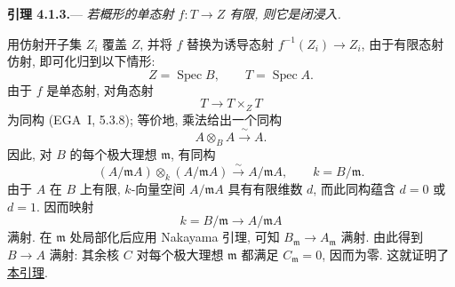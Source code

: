\medskip
{}\label{lem:sga3-V-4.1.3}%
\noindent\textbf{引理 4.1.3.}---
\textit{若概形的单态射 \(f:T\to Z\) 有限, 则它是闭浸入.}

用仿射开子集 \(Z_i\) 覆盖 \(Z\), 并将 \(f\) 替换为诱导态射
\(f^{-1}(Z_i)\to Z_i\), 由于有限态射仿射,
即可化归到以下情形:
\[
  Z=\operatorname{Spec}B,\qquad T=\operatorname{Spec}A.
\]
由于 \(f\) 是单态射, 对角态射
\[
  T\longrightarrow T\times_ZT
\]
为同构 (EGA~I, 5.3.8); 等价地, 乘法给出一个同构
\[
  A\otimes_BA\xrightarrow{\ \sim\ }A.
\]
因此, 对 \(B\) 的每个极大理想 \(\mathfrak m\), 有同构
\[
  (A/\mathfrak mA)\otimes_k(A/\mathfrak mA)
  \xrightarrow{\ \sim\ }A/\mathfrak mA,
  \qquad k=B/\mathfrak m.
\]
由于 \(A\) 在 \(B\) 上有限, \(k\)-向量空间 \(A/\mathfrak mA\)
具有有限维数 \(d\), 而此同构蕴含 \(d=0\) 或 \(d=1\).
因而映射
\[
  k=B/\mathfrak m\longrightarrow A/\mathfrak mA
\]
满射. 在 \(\mathfrak m\) 处局部化后应用 Nakayama 引理,
可知 \(B_{\mathfrak m}\to A_{\mathfrak m}\) 满射.
由此得到 \(B\to A\) 满射: 其余核 \(C\) 对每个极大理想
\(\mathfrak m\) 都满足 \(C_{\mathfrak m}=0\), 因而为零.
这就证明了 \hyperref[lem:sga3-V-4.1.3]{本引理}.

